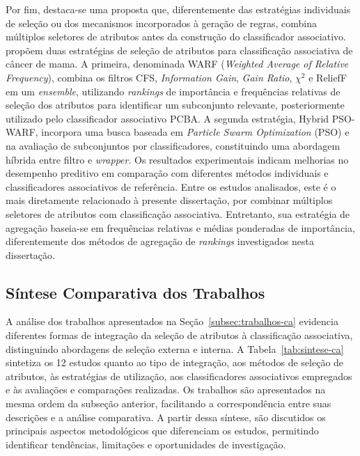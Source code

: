 Por fim, destaca-se uma proposta que, diferentemente das estratégias individuais de seleção ou dos mecanismos incorporados à geração de regras, combina múltiplos seletores de atributos antes da construção do classificador associativo.  propõem duas estratégias de seleção de atributos para classificação associativa de câncer de mama. A primeira, denominada WARF (\textit{Weighted Average of Relative Frequency}), combina os filtros CFS, \textit{Information Gain}, \textit{Gain Ratio}, $\chi^2$ e ReliefF em um \textit{ensemble}, utilizando \textit{rankings} de importância e frequências relativas de seleção dos atributos para identificar um subconjunto relevante, posteriormente utilizado pelo classificador associativo PCBA. A segunda estratégia, Hybrid PSO-WARF, incorpora uma busca baseada em \textit{Particle Swarm Optimization} (PSO) e na avaliação de subconjuntos por classificadores, constituindo uma abordagem híbrida entre filtro e \textit{wrapper}. Os resultados experimentais indicam melhorias no desempenho preditivo em comparação com diferentes métodos individuais e classificadores associativos de referência. Entre os estudos analisados, este é o mais diretamente relacionado à presente dissertação, por combinar múltiplos seletores de atributos com classificação associativa. Entretanto, sua estratégia de agregação baseia-se em frequências relativas e médias ponderadas de importância, diferentemente dos métodos de agregação de \textit{rankings} investigados nesta dissertação.

\subsection{Síntese Comparativa dos Trabalhos} \label{subsec:sintese-ca}

A análise dos trabalhos apresentados na Seção~\ref{subsec:trabalhos-ca} evidencia diferentes formas de integração da seleção de atributos à classificação associativa, distinguindo abordagens de seleção externa e interna. A Tabela~\ref{tab:sintese-ca} sintetiza os 12 estudos quanto ao tipo de integração, aos métodos de seleção de atributos, às estratégias de utilização, aos classificadores associativos empregados e às avaliações e comparações realizadas. Os trabalhos são apresentados na mesma ordem da subseção anterior, facilitando a correspondência entre suas descrições e a análise comparativa. A partir dessa síntese, são discutidos os principais aspectos metodológicos que diferenciam os estudos, permitindo identificar tendências, limitações e oportunidades de investigação.

